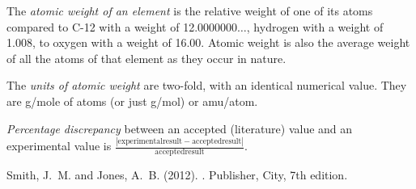 \documentclass{article}
\begin{document}
\begin{enumerate}
\begin{item}
The \emph{atomic weight of an element} is the relative weight of one of its atoms compared to C-12 with a weight of 12.0000000$\ldots$, hydrogen with a weight of 1.008, to oxygen with a weight of 16.00. Atomic weight is also the average weight of all the atoms of that element as they occur in nature.
\end{item}
\begin{item}
The \emph{units of atomic weight} are two-fold, with an identical numerical value. They are g/mole of atoms (or just g/mol) or amu/atom.
\end{item}
\begin{item}
\emph{Percentage discrepancy} between an accepted (literature) value and an experimental value is $\frac{|\mathrm{experimental result} - \mathrm{accepted result}|}{\mathrm{accepted result}}$.
\end{item}
\end{enumerate}


\begin{thebibliography}{9}

Smith, J.~M. and Jones, A.~B. (2012).
.
\newblock Publisher, City, 7th edition.

\end{thebibliography}
\end{document}
